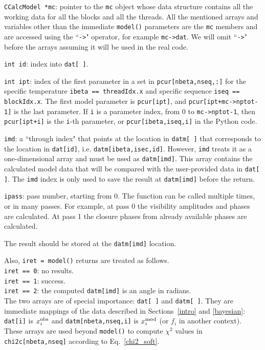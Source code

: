 \documentclass[preprint2]{aastex}
\begin{document}
\verb|CCalcModel *mc|: pointer to the \verb|mc| object whose data structure contains all the working data for all the blocks and all the threads. All the mentioned arrays and variables other than the immediate \verb|model()| parameters are the \verb|mc| members and are accessed using the ``\verb|->|" operator, for example \verb|mc->dat|. We will omit ``\verb|->|" before the arrays assuming it will be used in the real code. 

\verb|int id|: index into \verb|dat[ ]|.

\verb|int ipt|: index of the first parameter in a set in \verb|pcur[nbeta,nseq,:]| for the specific temperature \verb|ibeta == threadIdx.x| and specific sequence \verb|iseq == blockIdx.x|. The first model parameter is \verb|pcur[ipt]|, and \verb|pcur[ipt+mc->nptot-1]| is the last parameter. If \verb|i| is a parameter index, from 0 to \verb|mc->nptot-1|, then \verb|pcur[ipt+i]| is the \verb|i|-th parameter, or \verb|pcur[ibeta,iseq,i]| in the Python code.

\verb|imd|: a ``through index" that points at the location in \verb|datm[ ]| that corresponds to the location in \verb|dat[id]|, i.e. \verb|datm[ibeta,isec,id]|. However, \verb|imd| treats it as a one-dimensional array and must be used as \verb|datm[imd]|. This array contains the calculated model data that will be compared with the user-provided data in \verb|dat[ ]|. The \verb|imd| index is only used to save the result at \verb|datm[imd]| before the return.

\verb|ipass|: pass number, starting from 0. The function can be called multiple times, 
or in many passes. For example, at pass 0 the visibility amplitudes and phases are calculated. 
At pass 1 the closure phases from already available phases are calculated. 

The result should be stored at the \verb|datm[imd]| location.

Also, \verb|iret = model()| returns are treated as follows. \\
\verb|iret == 0|: no results. \\
\verb|iret == 1|: success. \\
\verb|iret == 2|: the computed \verb|datm[imd]| is an angle in radians. \\

The two arrays are of special importance: \verb|dat[ ]| and \verb|datm[ ]|. They are immediate mappings of the data described in Sections~\ref{intro} and \ref{bayesian}: \verb|dat[i]| is $x_i^{\rm obs}$ and 
\verb|datm[nbeta,nseq,i]| is $x_i^{\rm mod}$ (or $f_i$ in another context). These arrays are used beyond \verb|model()| to compute $\chi^2$ values in \verb|chi2c[nbeta,nseq]| according to  Eq.~\eqref{chi2_soft}.
\end{document}
